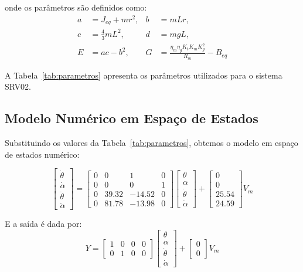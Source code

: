 \documentclass[9pt,a4paper,twocolumn,twoside]{tau-class/tau}
\begin{document}
onde os parâmetros são definidos como:
\begin{align*}
a &= J_{eq} + mr^2, & b &= mLr, \\
c &= \tfrac{4}{3} mL^2, & d &= mgL, \\
E &= ac - b^2, & G &= \tfrac{\eta_m \eta_g K_t K_m K_g^2}{R_m} - B_{eq}
\end{align*}

A Tabela~\ref{tab:parametros} apresenta os parâmetros utilizados para o sistema SRV02.
\subsection{Modelo Numérico em Espaço de Estados}

Substituindo os valores da Tabela~\ref{tab:parametros}, obtemos o modelo em espaço de estados numérico:

\begin{equation}
\begin{bmatrix}
\dot{\theta} \\
\dot{\alpha} \\
\ddot{\theta} \\
\ddot{\alpha}
\end{bmatrix}
=
\begin{bmatrix}
0 & 0 & 1 & 0 \\
0 & 0 & 0 & 1 \\
0 & 39.32 & -14.52 & 0 \\
0 & 81.78 & -13.98 & 0
\end{bmatrix}
\begin{bmatrix}
\theta \\ \alpha \\ \dot{\theta} \\ \dot{\alpha}
\end{bmatrix}
+
\begin{bmatrix}
0 \\ 0 \\ 25.54 \\ 24.59
\end{bmatrix} V_m
\label{eq:estadoNum}
\end{equation}

E a saída é dada por:
\begin{equation}
Y =
\begin{bmatrix}
1 & 0 & 0 & 0 \\
0 & 1 & 0 & 0
\end{bmatrix}
\begin{bmatrix}
\theta \\ \alpha \\ \dot{\theta} \\ \dot{\alpha}
\end{bmatrix}
+
\begin{bmatrix}
0 \\ 0
\end{bmatrix} V_m
\end{equation}
\end{document}
